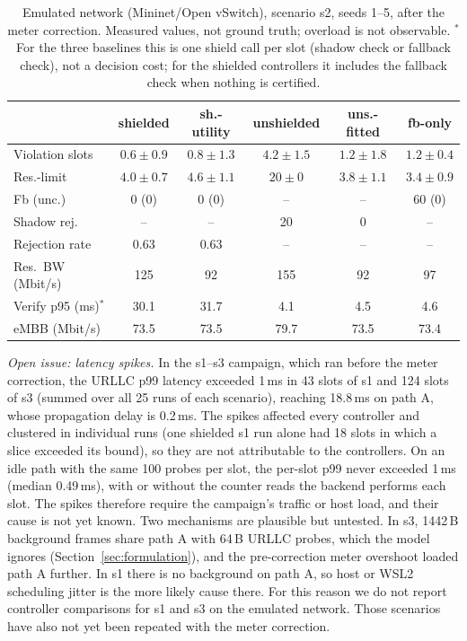 \begin{table}[t]
\caption{Emulated network (Mininet/Open vSwitch), scenario s2, seeds 1--5, after the meter correction. Measured values, not ground truth; overload is not observable. $^\ast$For the three baselines this is one shield call per slot (shadow check or fallback check), not a decision cost; for the shielded controllers it includes the fallback check when nothing is certified.}
\label{tab:mininet}
\centering
\scriptsize
\setlength{\tabcolsep}{2pt}
\begin{tabular}{@{}lccccc@{}}
\toprule
& shielded & sh.-utility & unshielded & uns.-fitted & fb-only\\
\midrule
Violation slots & $0.6\pm0.9$ & $0.8\pm1.3$ & $4.2\pm1.5$ & $1.2\pm1.8$ & $1.2\pm0.4$\\
Res.-limit & $4.0\pm0.7$ & $4.6\pm1.1$ & $20\pm0$ & $3.8\pm1.1$ & $3.4\pm0.9$\\
Fb (unc.) & 0 (0) & 0 (0) & -- & -- & 60 (0)\\
Shadow rej. & -- & -- & 20 & 0 & --\\
Rejection rate & 0.63 & 0.63 & -- & -- & --\\
Res.\ BW (Mbit/s) & 125 & 92 & 155 & 92 & 97\\
Verify p95 (ms)$^\ast$ & 30.1 & 31.7 & 4.1 & 4.5 & 4.6\\
eMBB (Mbit/s) & 73.5 & 73.5 & 79.7 & 73.5 & 73.4\\
\bottomrule
\end{tabular}
\end{table}

\emph{Open issue: latency spikes.} In the s1--s3 campaign, which ran before the
meter correction, the URLLC p99 latency exceeded 1\,ms in 43 slots of s1 and 124
slots of s3 (summed over all 25 runs of each scenario), reaching 18.8\,ms on path A, whose propagation delay is 0.2\,ms. The
spikes affected every controller and clustered in individual runs (one shielded s1
run alone had 18 slots in which a slice exceeded its bound), so they are not attributable to the controllers.
On an idle path with the same 100 probes per slot, the per-slot p99 never exceeded
1\,ms (median 0.49\,ms), with or without the counter reads the backend performs each
slot. The spikes therefore require the campaign's traffic or host load, and their
cause is not yet known. Two mechanisms are plausible but untested. In s3, 1442\,B
background frames share path A with 64\,B URLLC probes, which the model ignores
(Section~\ref{sec:formulation}), and the pre-correction meter overshoot loaded path A
further. In s1 there is no background on path A, so host or WSL2 scheduling jitter
is the more likely cause there. For this reason we do not report controller comparisons for
s1 and s3 on the emulated network. Those scenarios have also not yet been repeated
with the meter correction.

